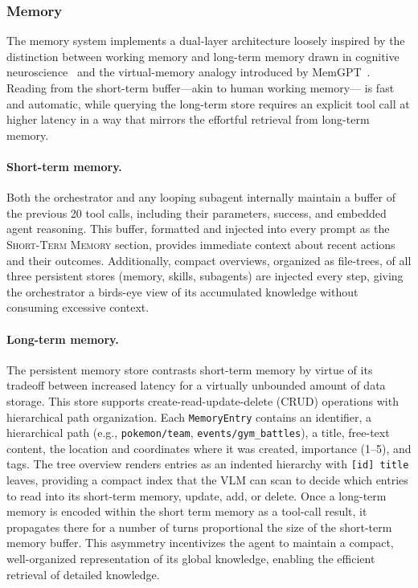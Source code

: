

\subsubsection{Memory}\label{sec:memory}

The memory system implements a dual-layer architecture loosely inspired by the distinction between working memory and long-term memory drawn in cognitive neuroscience~\citep{baddeley2000episodic, tulving1972episodic} and the virtual-memory analogy introduced by MemGPT~\citep{packer2023memgpt}. Reading from the short-term buffer---akin to human working memory--- is fast and automatic, while querying the long-term store requires an explicit tool call at higher latency in a way that mirrors the effortful retrieval from long-term memory. 

\paragraph{Short-term memory.} Both the orchestrator and any looping subagent internally maintain a buffer of the previous 20 tool calls, including their parameters, success, and embedded agent reasoning. This buffer, formatted and injected into every prompt as the \textsc{Short-Term Memory} section, provides immediate context about recent actions and their outcomes. Additionally, compact overviews, organized as file-trees, of all three persistent stores (memory, skills, subagents) are injected every step, giving the orchestrator a birds-eye view of its accumulated knowledge without consuming excessive context.

\paragraph{Long-term memory.} The persistent memory store contrasts short-term memory by virtue of its tradeoff between increased latency for a virtually unbounded amount of data storage. This store supports create-read-update-delete (CRUD) operations with hierarchical path organization. Each \texttt{MemoryEntry} contains an identifier, a hierarchical path (e.g., \texttt{pokemon/team}, \texttt{events/gym\_battles}), a title, free-text content, the location and coordinates where it was created, importance (1--5), and tags. The tree overview renders entries as an indented hierarchy with \texttt{[id] title} leaves, providing a compact index that the VLM can scan to decide which entries to read into its short-term memory, update, add, or delete. Once a long-term memory is encoded within the short term memory as a tool-call result, it propagates there for a number of turns proportional the size of the short-term memory buffer. This asymmetry incentivizes the agent to maintain a compact, well-organized representation of its global knowledge, enabling the efficient retrieval of detailed knowledge.

